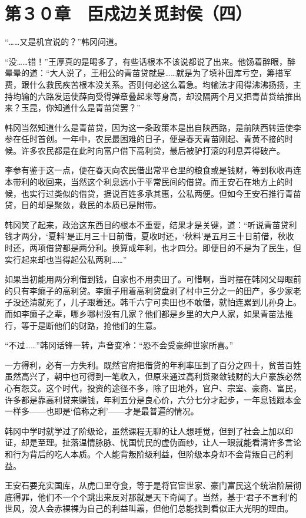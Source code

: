 \section{第３０章　臣戍边关觅封侯（四）}

“……又是机宜说的？”韩冈问道。

“没……错！”王厚真的是喝多了，有些话根本不该说都说了出来。他饧着醉眼，醉晕晕的道：“大人说了，王相公的青苗贷就是……就是为了填补国库亏空，筹措军费，跟什么救民疾苦根本没关系。否则何必这么着急。均输法才闹得沸沸扬扬，主持均输的六路发运使薛向受得弹章叠起来等身高，却没隔两个月又把青苗贷给推出来？玉昆，你知道什么是青苗贷罢？”

韩冈当然知道什么是青苗贷，因为这一条政策本是出自陕西路，是前陕西转运使李参在任时首创。一年中，农民最困难的日子，便是春天青苗刚起、青黄不接的时候。许多农民都是在此时向富户借下高利贷，最后被驴打滚的利息弄得破产。

李参有鉴于这一点，便在春天向农民借出常平仓里的粮食或是钱财，等到秋收再连本带利的收回来，当然这个利息远小于平常民间的借贷。而王安石在地方上的时候，也实行过类似的借贷，据说百姓多承其惠，公私两便。但如今王安石推行青苗贷，目的却是聚敛，救民的本质已是附带。

韩冈笑了起来，政治这东西目的根本不重要，结果才是关键，道：“听说青苗贷利钱才两分，‘夏料’是正月三十日前借，夏收时还，‘秋料’是五月三十日前借，秋收时还，两项借贷都是两分利。换算成年利，也才四分。即便目的不是为了民生，但实行起来却也当得起公私两利……”

如果当初能用两分利借到钱，自家也不用卖田了。可惜啊，当时摆在韩冈父母眼前的只有李癞子的高利贷。李癞子用着高利贷盘剥了村中三分之一的田产，多少家老子没还清就死了，儿子跟着还。韩千六宁可卖田也不敢借，就怕连累到儿孙身上。而如李癞子之辈，哪乡哪村没有几家？他们都是乡里的大户人家，如果青苗法推行，等于是断他们的财路，抢他们的生意。

“不过……”韩冈话锋一转，声音变冷：“恐不会受豪绅世家所喜。”

一方得利，必有一方失利。既然官府把借贷的年利率压到了百分之四十，贫苦百姓虽然高兴了，朝中也可得到一笔收入，但原来通过高利贷聚敛钱财的大户豪族必然心有怨艾。这个时代，投资的途径不多，除了田地外，官户、宗室、豪商、富民，许多都是靠高利贷来赚钱，年利五分是良心价，六分七分才起步，一年息钱跟本金一样多——也即是‘倍称之利’——才是最普遍的情况。

韩冈中学时就学过了阶级论，虽然课程无聊的让人想睡觉，但到了社会上加以印证，却是至理。扯落温情脉脉、忧国忧民的虚伪面纱，让人一眼就能看清许多言论和行为背后的吃人本质。个人能背叛阶级利益，但阶级本身却不会背叛自己的利益。

王安石要充实国库，从虎口里夺食，等于是将官宦世家、豪门富民这个统治阶层彻底得罪，他们不一个个跳出来反对那就是天下奇闻了。当然，基于‘君子不言利’的世风，没人会赤裸裸为自己的利益叫嚣，但他们总能找到看似正大光明的理由。


